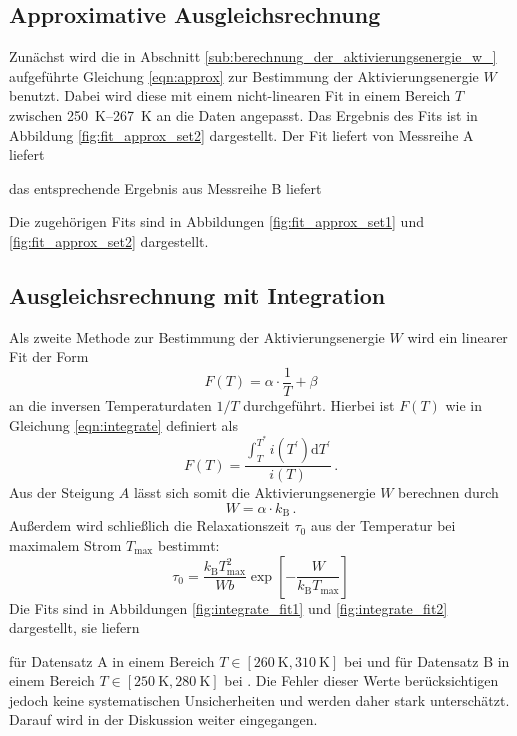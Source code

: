 \subsection{Approximative Ausgleichsrechnung}
\label{subsec:approx}
Zunächst wird die in Abschnitt \ref{sub:berechnung_der_aktivierungsenergie_w_}
aufgeführte Gleichung \ref{eqn:approx} zur Bestimmung der Aktivierungsenergie
$W$ benutzt. Dabei wird diese mit einem nicht-linearen Fit in einem Bereich
$T$ zwischen \SIrange{250}{267}{\kelvin} an die Daten angepasst.
Das Ergebnis des Fits ist in Abbildung \ref{fig:fit_approx_set2} dargestellt.
Der Fit liefert von Messreihe A liefert



das entsprechende Ergebnis aus Messreihe B liefert



Die zugehörigen Fits sind in Abbildungen \ref{fig:fit_approx_set1}
und \ref{fig:fit_approx_set2} dargestellt.

\subsection{Ausgleichsrechnung mit Integration}
\label{subsec:integration}
Als zweite Methode zur Bestimmung der Aktivierungsenergie $W$ wird ein
linearer Fit der Form
\begin{equation*}
    F(T) = \alpha\cdot\frac{1}{T} + \beta
\end{equation*}
an die inversen Temperaturdaten $1/T$ durchgeführt.
Hierbei ist $F(T)$ wie in Gleichung \ref{eqn:integrate} definiert als
\begin{equation*}
    F(T) = \frac{\int_T^{T^\ast} i(T^\prime)\mathrm{d}T^\prime}{i(T)}\,.
\end{equation*}
Aus der Steigung $A$ lässt sich somit die Aktivierungsenergie $W$
berechnen durch
\begin{equation*}
    W = \alpha\cdot k_\text{B}\,.
\end{equation*}
Außerdem wird schließlich die Relaxationszeit $\tau_0$ aus der Temperatur
bei maximalem Strom $T_\text{max}$ bestimmt:
\begin{equation}
    \label{eqn:tau0}
    \tau_0 = \frac{k_\text{B}T_\text{max}^2}{Wb}
             \exp\!\left[-\frac{W}{k_\text{B}T_\text{max}} \right]
\end{equation}
Die Fits sind in Abbildungen \ref{fig:integrate_fit1} und \ref{fig:integrate_fit2}
dargestellt, sie liefern



für Datensatz A in einem Bereich $T \in [\SI{260}{\kelvin}, \SI{310}{\kelvin}]$ bei  und
für Datensatz B in einem Bereich $T \in [\SI{250}{\kelvin}, \SI{280}{\kelvin}]$ bei .
Die Fehler dieser Werte berücksichtigen jedoch keine systematischen Unsicherheiten
und werden daher stark unterschätzt. Darauf wird in der Diskussion weiter eingegangen.
\newpage
